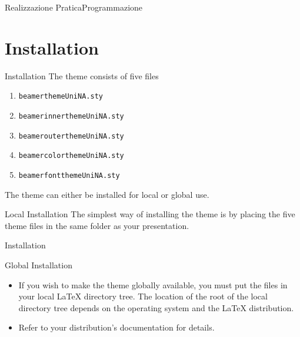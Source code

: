 \documentclass[10pt,aspectratio=169
	]{beamer}
\begin{document}
	\begin{frame}{Realizzazione Pratica}{Programmazione}
	\centering{}

	\end{frame}
	
	\begin{frame}
	\end{frame}
	
	
	
	
	
	
	
	
	
	
	

	\section{Installation}
	\begin{frame}{Installation}
	The theme consists of five files
	\begin{enumerate}
		\item {\tt beamerthemeUniNA.sty}
		\item {\tt beamerinnerthemeUniNA.sty}
		\item {\tt beamerouterthemeUniNA.sty}
		\item {\tt beamercolorthemeUniNA.sty}
		\item {\tt beamerfontthemeUniNA.sty}
	\end{enumerate}
	The theme can either be installed for local or global use.
	\pause
	\begin{block}{Local Installation}
		The simplest way of installing the theme is by placing the five theme files in the same 
		folder as your presentation.
	\end{block}
	\end{frame}

	\begin{frame}{Installation}
	\begin{block}{Global Installation}
	\begin{itemize}
		\item If you wish to make the theme globally available, you must put the files in your local LaTeX directory tree.
		The location of the root of the local directory tree depends on the operating system and the LaTeX distribution.
		\item Refer to your distribution's documentation for details.
	\end{itemize}
	\end{block}
	\end{frame}
\end{document}
